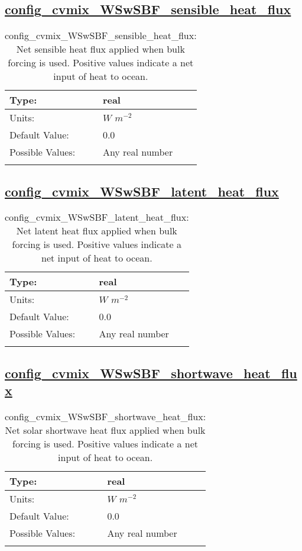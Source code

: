 \subsection[config\_cvmix\_WSwSBF\_sensible\_heat\_flux]{\hyperref[sec:nm_tab_cvmix_WSwSBF]{config\_cvmix\_WSwSBF\_sensible\_heat\_flux}}
\label{subsec:nm_sec_config_cvmix_WSwSBF_sensible_heat_flux}
\begin{center}
\begin{longtable}{| p{2.0in} || p{4.0in} |}
    \hline
    Type: & real \\
    \hline
    Units: & $W$ $m^{-2}$ \\
    \hline
    Default Value: & 0.0 \\
    \hline
    Possible Values: & Any real number \\
    \hline
    \caption{config\_cvmix\_WSwSBF\_sensible\_heat\_flux: Net sensible heat flux applied when bulk forcing is used. Positive values indicate a net input of heat to ocean.}
\end{longtable}
\end{center}
\subsection[config\_cvmix\_WSwSBF\_latent\_heat\_flux]{\hyperref[sec:nm_tab_cvmix_WSwSBF]{config\_cvmix\_WSwSBF\_latent\_heat\_flux}}
\label{subsec:nm_sec_config_cvmix_WSwSBF_latent_heat_flux}
\begin{center}
\begin{longtable}{| p{2.0in} || p{4.0in} |}
    \hline
    Type: & real \\
    \hline
    Units: & $W$ $m^{-2}$ \\
    \hline
    Default Value: & 0.0 \\
    \hline
    Possible Values: & Any real number \\
    \hline
    \caption{config\_cvmix\_WSwSBF\_latent\_heat\_flux: Net latent heat flux applied when bulk forcing is used. Positive values indicate a net input of heat to ocean.}
\end{longtable}
\end{center}
\subsection[config\_cvmix\_WSwSBF\_shortwave\_heat\_flux]{\hyperref[sec:nm_tab_cvmix_WSwSBF]{config\_cvmix\_WSwSBF\_shortwave\_heat\_flux}}
\label{subsec:nm_sec_config_cvmix_WSwSBF_shortwave_heat_flux}
\begin{center}
\begin{longtable}{| p{2.0in} || p{4.0in} |}
    \hline
    Type: & real \\
    \hline
    Units: & $W$ $m^{-2}$ \\
    \hline
    Default Value: & 0.0 \\
    \hline
    Possible Values: & Any real number \\
    \hline
    \caption{config\_cvmix\_WSwSBF\_shortwave\_heat\_flux: Net solar shortwave heat flux applied when bulk forcing is used. Positive values indicate a net input of heat to ocean.}
\end{longtable}
\end{center}
